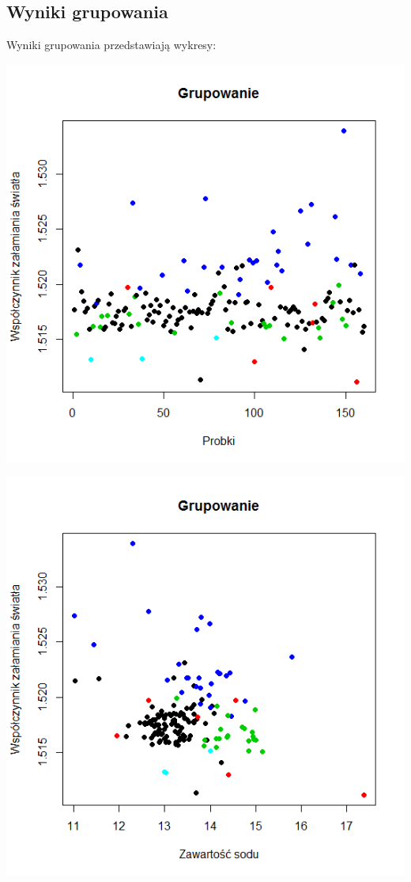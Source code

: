 \documentclass[a4paper,12pt,twoside]{article}
\begin{document}
\subsection{Wyniki grupowania}
Wyniki grupowania przedstawiają wykresy:
\begin{center}
\includegraphics[width=.75\textwidth]{img/grupowanie_probki.png}
\end{center}
\begin{center}
\includegraphics[width=.75\textwidth]{img/grupowanie_sod.png}
\end{center}
\end{document}
